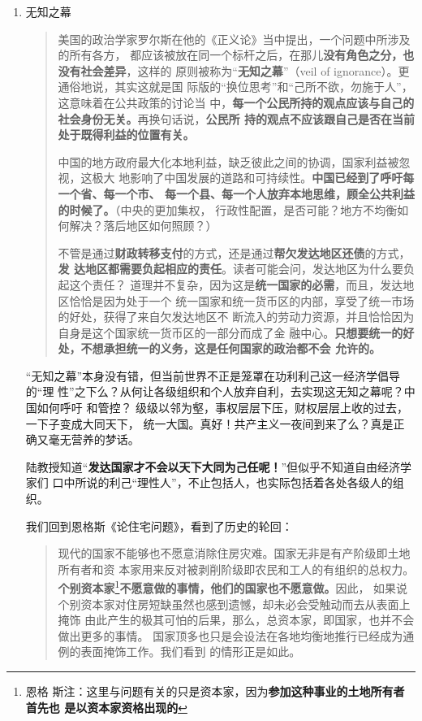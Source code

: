 \begin{enumerate}

\item 无知之幕
  \begin{quotation}
    美国的政治学家罗尔斯在他的《正义论》当中提出，一个问题中所涉及的所有各方，
    都应该被放在同一个标杆之后，在那儿\textbf{没有角色之分，也没有社会差异}，这样的
    原则被称为“\textbf{无知之幕}”（veil of ignorance）。更通俗地说，其实这就是国
    际版的“换位思考”和“己所不欲，勿施于人”，这意味着在公共政策的讨论当
    中，\textbf{每一个公民所持的观点应该与自己的社会身份无关。}再换句话说，\textbf{公民所
      持的观点不应该跟自己是否在当前处于既得利益的位置有关。}


    中国的地方政府最大化本地利益，缺乏彼此之间的协调，国家利益被忽视，这极大
    地影响了中国发展的道路和可持续性。\textbf{中国已经到了呼吁每一个省、每一个市、
      每一个县、每一个人放弃本地思维，顾全公共利益的时候了。}（中央的更加集权，
    行政性配置，是否可能？地方不均衡如何解决？落后地区如何照顾？）


    不管是通过\textbf{财政转移支付}的方式，还是通过\textbf{帮欠发达地区还债}的方式，\textbf{发
      达地区都需要负起相应的责任}。读者可能会问，发达地区为什么要负起这个责任？
    道理并不复杂，因为这是\textbf{统一国家的必需}，而且，发达地区恰恰是因为处于一个
    统一国家和统一货币区的内部，享受了统一市场的好处，获得了来自欠发达地区不
    断流入的劳动力资源，并且恰恰因为自身是这个国家统一货币区的一部分而成了金
    融中心。\textbf{只想要统一的好处，不想承担统一的义务，这是任何国家的政治都不会
      允许的。}
  \end{quotation}

  “无知之幕”本身没有错，但当前世界不正是笼罩在功利利己这一经济学倡导的“理
  性”之下么？从何让各级组织和个人放弃自利，去实现这无知之幕呢？中国如何呼吁
  和管控？ 级级以邻为壑，事权层层下压，财权层层上收的过去，一下子变成大同天下，
  统一大国。真好！共产主义一夜间到来了么？真是正确又毫无营养的梦话。

  陆教授知道“\textbf{发达国家才不会以天下大同为己任呢！}”但似乎不知道自由经济学家们
  口中所说的利己“理性人”，不止包括人，也实际包括着各处各级人的组织。

  我们回到恩格斯《论住宅问题》，看到了历史的轮回：

  \begin{quotation}
    现代的国家不能够也不愿意消除住房灾难。国家无非是有产阶级即土地所有者和资
    本家用来反对被剥削阶级即农民和工人的有组织的总权力。\textbf{个别资本家}\footnote{恩格
      斯注：这里与问题有关的只是资本家，因为\textbf{参加这种事业的土地所有者首先也
        是以资本家资格出现的}}\textbf{不愿意做的事情，他们的国家也不愿意做。}因此，
    如果说个别资本家对住房短缺虽然也感到遗憾，却未必会受触动而去从表面上掩饰
    由此产生的极其可怕的后果，那么，总资本家，即国家，也并不会做出更多的事情。
    国家顶多也只是会设法在各地均衡地推行已经成为通例的表面掩饰工作。我们看到
    的情形正是如此。
  \end{quotation}


\end{enumerate}
